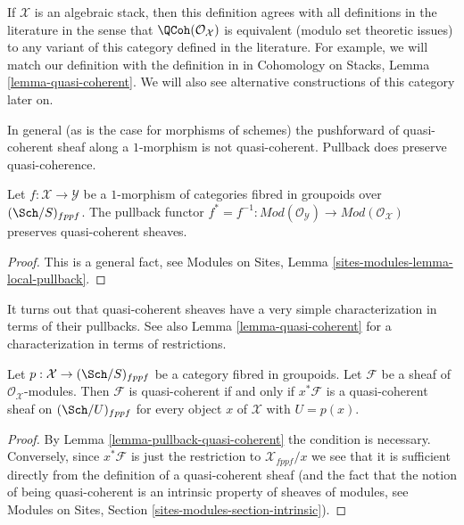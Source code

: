 \noindent
If $\mathcal{X}$ is an algebraic stack, then this definition agrees with all
definitions in the literature in the sense that $\QCoh(\mathcal{O}_\mathcal{X})$
is equivalent (modulo set theoretic issues) to any variant of this category
defined in the literature. For example, we will match our definition with
the definition in \cite[Definition 6.1]{olsson_sheaves} in
Cohomology on Stacks, Lemma \ref{lemma-quasi-coherent}.
We will also see alternative constructions of this category later on.

\medskip\noindent
In general (as is the case for morphisms of schemes) the pushforward
of quasi-coherent sheaf along a $1$-morphism is not quasi-coherent.
Pullback does preserve quasi-coherence.

\begin{lemma}
\label{lemma-pullback-quasi-coherent}
Let $f : \mathcal{X} \to \mathcal{Y}$ be a $1$-morphism of categories
fibred in groupoids over $(\Sch/S)_{fppf}$.
The pullback functor
$f^* = f^{-1} : \textit{Mod}(\mathcal{O}_\mathcal{Y}) \to
\textit{Mod}(\mathcal{O}_\mathcal{X})$
preserves quasi-coherent sheaves.
\end{lemma}

\begin{proof}
This is a general fact, see
Modules on Sites, Lemma \ref{sites-modules-lemma-local-pullback}.
\end{proof}

\noindent
It turns out that quasi-coherent sheaves have a very simple
characterization in terms of their pullbacks. See also
Lemma \ref{lemma-quasi-coherent}
for a characterization in terms of restrictions.

\begin{lemma}
\label{lemma-characterize-quasi-coherent}
Let $p : \mathcal{X} \to (\Sch/S)_{fppf}$ be a category
fibred in groupoids. Let $\mathcal{F}$
be a sheaf of $\mathcal{O}_\mathcal{X}$-modules. Then $\mathcal{F}$
is quasi-coherent if and only if $x^*\mathcal{F}$ is a quasi-coherent
sheaf on $(\Sch/U)_{fppf}$ for every object $x$ of
$\mathcal{X}$ with $U = p(x)$.
\end{lemma}

\begin{proof}
By
Lemma \ref{lemma-pullback-quasi-coherent}
the condition is necessary. Conversely, since $x^*\mathcal{F}$
is just the restriction to $\mathcal{X}_{fppf}/x$ we see that it
is sufficient directly from the definition of a quasi-coherent sheaf
(and the fact that the notion of being quasi-coherent is an intrinsic
property of sheaves of modules, see
Modules on Sites, Section \ref{sites-modules-section-intrinsic}).
\end{proof}

